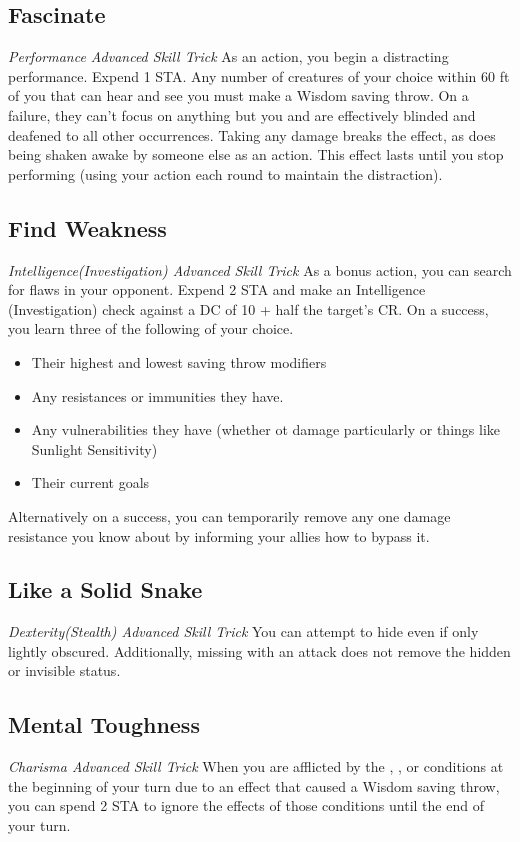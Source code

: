 \subsection{Fascinate}
\textit{Performance Advanced Skill Trick}
As an action, you begin a distracting performance. Expend 1 STA. Any number of creatures of your choice within 60 ft of you that can hear and see you must make a Wisdom saving throw. On a failure, they can't focus on anything but you and are effectively blinded and deafened to all other occurrences. Taking any damage breaks the effect, as does being shaken awake by someone else as an action. This effect lasts until you stop performing (using your action each round to maintain the distraction).

\subsection{Find Weakness}
\textit{Intelligence(Investigation) Advanced Skill Trick}
As a bonus action, you can search for flaws in your opponent. Expend 2 STA and make an Intelligence (Investigation) check against a DC of 10 + half the target's CR. On a success, you learn three of the following of your choice.
\begin{itemize}
	\item Their highest and lowest saving throw modifiers
	\item Any resistances or immunities they have.
	\item Any vulnerabilities they have (whether ot damage particularly or things like Sunlight Sensitivity)
	\item Their current goals
\end{itemize}

Alternatively on a success, you can temporarily remove any one damage resistance you know about by informing your allies how to bypass it.

\subsection{Like a Solid Snake}
\textit{Dexterity(Stealth) Advanced Skill Trick}
You can attempt to hide even if only lightly obscured. Additionally, missing with an attack does not remove the hidden or invisible status.

\subsection{Mental Toughness}
\textit{Charisma Advanced Skill Trick}
When you are afflicted by the , , or  conditions at the beginning of your turn due to an effect that caused a Wisdom saving throw, you can spend 2 STA to ignore the effects of those conditions until the end of your turn.

